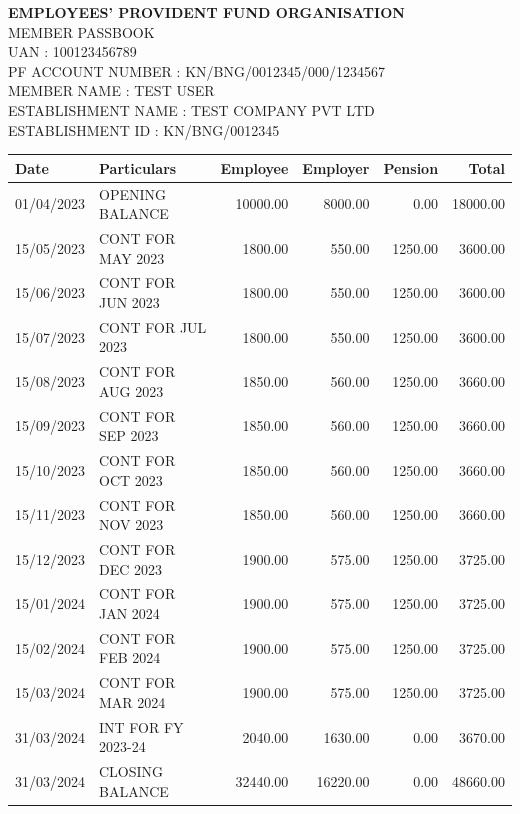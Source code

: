 \documentclass[10pt]{article}
\begin{document}
\noindent\textbf{EMPLOYEES' PROVIDENT FUND ORGANISATION}\\
MEMBER PASSBOOK\\[4pt]
UAN : 100123456789\\
PF ACCOUNT NUMBER : KN/BNG/0012345/000/1234567\\
MEMBER NAME : TEST USER\\
ESTABLISHMENT NAME : TEST COMPANY PVT LTD\\
ESTABLISHMENT ID : KN/BNG/0012345\\[8pt]

\begin{tabular}{|l|l|r|r|r|r|}
\hline
Date & Particulars & Employee & Employer & Pension & Total \\
\hline
01/04/2023 & OPENING BALANCE & 10000.00 & 8000.00 & 0.00 & 18000.00 \\
\hline
15/05/2023 & CONT FOR MAY 2023 & 1800.00 & 550.00 & 1250.00 & 3600.00 \\
\hline
15/06/2023 & CONT FOR JUN 2023 & 1800.00 & 550.00 & 1250.00 & 3600.00 \\
\hline
15/07/2023 & CONT FOR JUL 2023 & 1800.00 & 550.00 & 1250.00 & 3600.00 \\
\hline
15/08/2023 & CONT FOR AUG 2023 & 1850.00 & 560.00 & 1250.00 & 3660.00 \\
\hline
15/09/2023 & CONT FOR SEP 2023 & 1850.00 & 560.00 & 1250.00 & 3660.00 \\
\hline
15/10/2023 & CONT FOR OCT 2023 & 1850.00 & 560.00 & 1250.00 & 3660.00 \\
\hline
15/11/2023 & CONT FOR NOV 2023 & 1850.00 & 560.00 & 1250.00 & 3660.00 \\
\hline
15/12/2023 & CONT FOR DEC 2023 & 1900.00 & 575.00 & 1250.00 & 3725.00 \\
\hline
15/01/2024 & CONT FOR JAN 2024 & 1900.00 & 575.00 & 1250.00 & 3725.00 \\
\hline
15/02/2024 & CONT FOR FEB 2024 & 1900.00 & 575.00 & 1250.00 & 3725.00 \\
\hline
15/03/2024 & CONT FOR MAR 2024 & 1900.00 & 575.00 & 1250.00 & 3725.00 \\
\hline
31/03/2024 & INT FOR FY 2023-24 & 2040.00 & 1630.00 & 0.00 & 3670.00 \\
\hline
31/03/2024 & CLOSING BALANCE & 32440.00 & 16220.00 & 0.00 & 48660.00 \\
\hline
\end{tabular}
\end{document}

